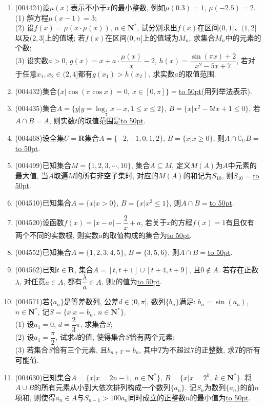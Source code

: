 \documentclass[10pt,a4paper]{article}
\newcommand{\blank}[1]{\underline{\hbox to #1pt{}}}
\begin{document}
\begin{enumerate}[1.]
\item {\tiny (004424)}设$\mu (x)$表示不小于$x$的最小整数, 例如$\mu(0.3)=1$, $\mu(-2.5)=2$.\\
(1) 解方程$\mu(x-1)=3$;\\
(2) 设$f(x)=\mu (x\cdot \mu (x))$, $n\in \mathbf{N}^*$, 试分别求出$f(x)$在区间$(0,1]$、$(1,2]$以及$(2,3]$上的值域; 若$f(x)$在区间$(0,n]$上的值域为$M_n$, 求集合$M_n$中的元素的个数;\\
(3) 设实数$a>0$, $g(x)=x+a\cdot \dfrac{\mu (x)}x-2$, $h(x)=\dfrac{\sin (\pi x)+2}{x^2-5x+7}$, 若对于任意$x_1,x_2\in (2,4]$都有$g(x_1)>h(x_2)$, 求实数$a$的取值范围.
\item {\tiny (004432)}集合$\{x|\cos(\pi \cos x)=0,\ x\in [0,\pi]\}=$\blank{50}(用列举法表示).
\item {\tiny (004435)}集合$A=\{y|y=\log_{\frac 12}x-x,1\le x\le 2\}$, $B=\{x|x^2-5tx+1\le 0\}$, 若$A\cap B=A$, 则实数$t$的取值范围是\blank{50}.
\item {\tiny (004468)}设全集$U=\mathbf{R}$集合$A=\{-2,-1,0,1,2\}$, $B=\{x|x\ge 0\}$, 则$A\cap \complement_UB=$\blank{50}.
\item {\tiny (004499)}已知集合$M=\{1,2,3,\cdots,10\}$, 集合$A\subseteq M$, 定义$M(A)$为$A$中元素的最大值, 当$A$取遍$M$的所有非空子集时, 对应的$M(A)$的和记为$S_{10}$, 则$S_{10}=$\blank{50}.
\item {\tiny (004510)}已知集合$A=\{x|x>0\}$, $B=\{x|x^2\le 1\}$, 则$A\cap B=$\blank{50}.
\item {\tiny (004520)}设函数$f(x)=|x-a|-\dfrac 2x+a$, 若关于$x$的方程$f(x)=1$有且仅有两个不同的实数根, 则实数$a$的取值构成的集合为\blank{50}.
\item {\tiny (004552)}已知集合$A=\{1,2,3,4,5\}$, $B=\{3,5,6\}$, 则$A\cap B=$\blank{50}.
\item {\tiny (004562)}已知$t\in \mathbf{R}$, 集合$A=[t,t+1]\cup [t+4,t+9]$, 且$0\not\in A$. 若存在正数$\lambda$, 对任意$a\in A$, 都有$\dfrac{\lambda}a\in A$, 则$t$的值为\blank{50}.
\item {\tiny (004571)}若$\{a_n\}$是等差数列, 公差$d\in (0,\pi]$, 数列$\{b_n\}$满足: $b_n=\sin (a_n)$, $n \in \mathbf{N}^*$, 记$S=\{x|x=b_n, \ n\in \mathbf{N}^*\}$.\\
(1) 设$a_1=0$, $d=\dfrac 23 \pi$, 求集合$S$;\\
(2) 设$a_1=\dfrac\pi 2$, 试求$d$的值, 使得集合$S$恰有两个元素;\\
(3) 若集合$S$恰有三个元素, 且$b_{n+T}=b_n$, 其中$T$为不超过$7$的正整数, 求$T$的所有可能值.
\item {\tiny (004630)}已知集合$A=\{x|x=2n-1, \ n\in \mathbf{N}^*\}$, $B=\{x|x=2^k, \ k\in \mathbf{N}^*\}$. 将$A\cup B$的所有元素从小到大依次排列构成一个数列$\{a_n\}$. 记$S_n$为数列$\{a_n\}$的前$n$项和, 则使得$a_n\in A$与${S_{n-1}}>100{a_n}$同时成立的正整数$n$的最小值为\blank{50}.

\end{enumerate}
\end{document}
